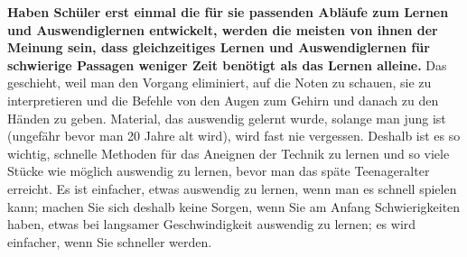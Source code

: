 \textbf{Haben Schüler erst einmal die für sie passenden Abläufe zum Lernen und Auswendiglernen entwickelt, werden die meisten von ihnen der Meinung sein, dass gleichzeitiges Lernen und Auswendiglernen für schwierige Passagen weniger Zeit benötigt als das Lernen alleine.}
Das geschieht, weil man den Vorgang eliminiert, auf die Noten zu schauen, sie zu interpretieren und die Befehle von den Augen zum Gehirn und danach zu den Händen zu geben.
Material, das auswendig gelernt wurde, solange man jung ist (ungefähr bevor man 20 Jahre alt wird), wird fast nie vergessen.
Deshalb ist es so wichtig, schnelle Methoden für das Aneignen der Technik zu lernen und so viele Stücke wie möglich auswendig zu lernen, bevor man das späte Teenageralter erreicht.
Es ist einfacher, etwas auswendig zu lernen, wenn man es schnell spielen kann; machen Sie sich deshalb keine Sorgen, wenn Sie am Anfang Schwierigkeiten haben, etwas bei langsamer Geschwindigkeit auswendig zu lernen; es wird einfacher, wenn Sie schneller werden.


\label{c1ii12mental}

